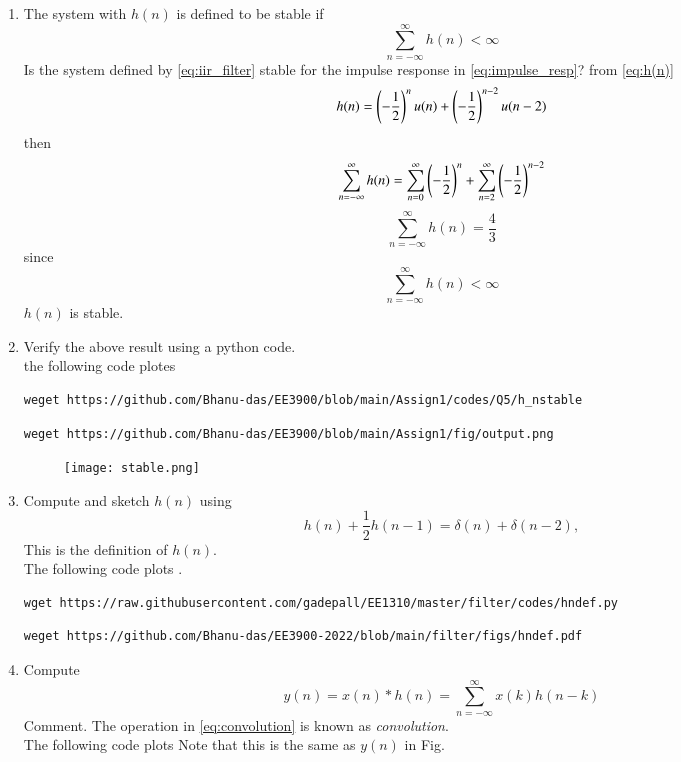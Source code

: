 \documentclass[journal,12pt,twocolumn]{IEEEtran}
\renewcommand\thesection{\arabic{section}}
\begin{document}
\begin{enumerate}[label=\thesection.\arabic*]
\item The system with $h(n)$ is defined to be stable if
\begin{equation}
\sum_{n=-\infty}^{\infty}h(n) < \infty
\end{equation}
Is the system defined by \eqref{eq:iir_filter} stable for the impulse response in \eqref{eq:impulse_resp}?
%
\solution from \ref{eq:h(n)}
\begin{equation}
    h(n) = \left(-\frac{1}{2}\right)^{n}u(n) + \left(-\frac{1}{2}\right)^{n-2}u(n-2) 
\end{equation}
then 
\begin{equation}
    \sum_{n=-\infty}^{\infty}h(n) = \sum_{n=0}^{\infty} \left(-\frac{1}{2}\right)^{n} + \sum_{n=2}^{\infty} \left(-\frac{1}{2}\right)^{n-2}
\end{equation}
\begin{equation}
    \sum_{n=-\infty}^{\infty}h(n) = \frac{4}{3}
\end{equation}
since 
\begin{equation}
    \sum_{n=-\infty}^{\infty}h(n) < \infty
\end{equation}
$h(n)$ is stable.
\item Verify the above result using a python code.
\\
\solution
the following code plotes 
\begin{lstlisting}
weget https://github.com/Bhanu-das/EE3900/blob/main/Assign1/codes/Q5/h_nstable
\end{lstlisting}
\begin{lstlisting}
weget https://github.com/Bhanu-das/EE3900/blob/main/Assign1/fig/output.png
\end{lstlisting}
\begin{figure}[!ht]
\centering
\texttt{[image: stable.png]}
\caption{}
\label{fig:stable}
\end{figure}

\item 
Compute and sketch $h(n)$ using 
\begin{equation}
\label{eq:iir_filter_h}
h(n) + \frac{1}{2}h(n-1) = \delta(n) + \delta(n-2), 
\end{equation}
%
This is the definition of $h(n)$.
\\
\solution The following code plots . 
 
%
\begin{lstlisting}
wget https://raw.githubusercontent.com/gadepall/EE1310/master/filter/codes/hndef.py
\end{lstlisting}
\begin{lstlisting}
weget https://github.com/Bhanu-das/EE3900-2022/blob/main/filter/figs/hndef.pdf
\end{lstlisting}
%
\item Compute 
%
\begin{equation}
\label{eq:convolution}
y(n) = x(n)*h(n) = \sum_{n=-\infty}^{\infty}x(k)h(n-k)
\end{equation}
%
Comment. The operation in \eqref{eq:convolution} is known as
{\em convolution}.
%
\\
\solution The following code plots  Note that this is the same as 
$y(n)$ in  Fig. 


\end{enumerate}
\end{document}

